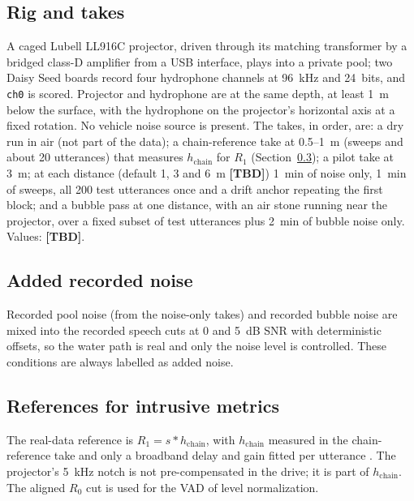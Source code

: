 \documentclass[conference]{IEEEtran}
\newcommand{\tbd}{\textbf{[TBD]}}
\begin{document}
\subsection{Rig and takes}
\label{sec:rig}
A caged Lubell LL916C projector, driven through its matching transformer by a bridged class-D
amplifier from a USB interface, plays into a private pool; two Daisy Seed boards record four
hydrophone channels at 96~kHz and 24~bits, and \texttt{ch0} is scored. Projector and hydrophone are at
the same depth, at least 1~m below the surface, with the hydrophone on the projector's horizontal axis
at a fixed rotation. No vehicle noise source is present. The takes, in order, are: a dry run in air
(not part of the data); a chain-reference take at 0.5--1~m (sweeps and about 20 utterances) that
measures $h_{\mathrm{chain}}$ for $R_1$ (Section~\ref{sec:refs}); a pilot take at 3~m; at each
distance (default 1, 3 and 6~m \tbd) 1~min of noise only, 1~min of sweeps, all 200 test utterances
once and a drift anchor repeating the first block; and a bubble pass at one distance, with an air
stone running near the projector, over a fixed subset of test utterances plus 2~min of bubble noise
only. Values: \tbd.

\subsection{Added recorded noise}
\label{sec:addednoise}
Recorded pool noise (from the noise-only takes) and recorded bubble noise are mixed into the recorded
speech cuts at 0 and 5~dB SNR with deterministic offsets, so the water path is real and only the noise
level is controlled. These conditions are always labelled as added noise.

\subsection{References for intrusive metrics}
\label{sec:refs}
The real-data reference is $R_1 = s * h_{\mathrm{chain}}$, with $h_{\mathrm{chain}}$ measured in the
chain-reference take and only a broadband delay and gain fitted per utterance
\cite{yang2024realman}. The projector's 5~kHz notch is not pre-compensated in the drive; it is part of
$h_{\mathrm{chain}}$. The aligned $R_0$ cut is used for the VAD of level normalization.
\end{document}
